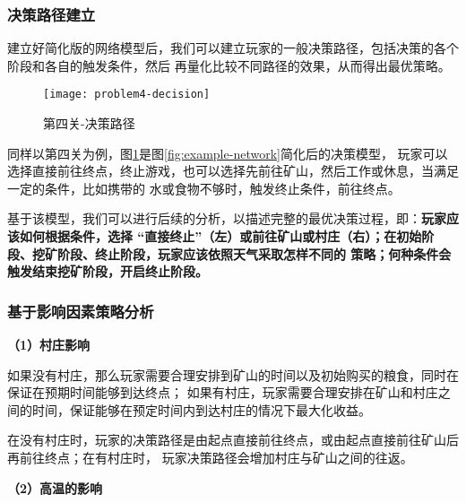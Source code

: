\documentclass[withoutpreface,bwprint]{cumcmthesis} %
\begin{document}
\subsubsection{决策路径建立}

建立好简化版的网络模型后，我们可以建立玩家的一般决策路径，包括决策的各个阶段和各自的触发条件，然后
再量化比较不同路径的效果，从而得出最优策略。


\begin{figure}[!h]
    \centering
    \texttt{[image: problem4-decision]}
    \caption{第四关-决策路径}
    \label{fig:example-decision}
\end{figure}

同样以第四关为例，图\ref{fig:example-decision}是图\ref{fig:example-network}简化后的决策模型，
玩家可以选择直接前往终点，终止游戏，也可以选择先前往矿山，然后工作或休息，当满足一定的条件，比如携带的
水或食物不够时，触发终止条件，前往终点。


基于该模型，我们可以进行后续的分析，以描述完整的最优决策过程，即：\textbf{玩家应该如何根据条件，选择
“直接终止”（左）或前往矿山或村庄（右）；在初始阶段、挖矿阶段、终止阶段，玩家应该依照天气采取怎样不同的
策略；何种条件会触发结束挖矿阶段，开启终止阶段。}

\subsubsection{基于影响因素策略分析}


\textbf{（1）村庄影响}

如果没有村庄，那么玩家需要合理安排到矿山的时间以及初始购买的粮食，同时在保证在预期时间能够到达终点；
如果有村庄，玩家需要合理安排在矿山和村庄之间的时间，保证能够在预定时间内到达村庄的情况下最大化收益。

\begin{stratygy}
    在没有村庄时，玩家的决策路径是由起点直接前往终点，或由起点直接前往矿山后再前往终点；在有村庄时，
    玩家决策路径会增加村庄与矿山之间的往返。
    \label{str:hot}
\end{stratygy}

\textbf{（2）高温的影响}
\end{document}
